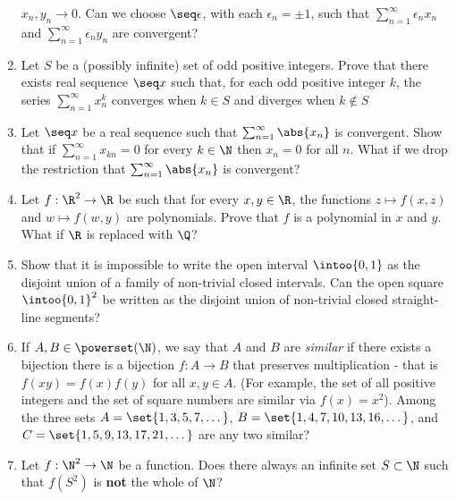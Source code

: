 \documentclass[12pt,a4paper]{article}
\begin{document}
\begin{enumerate}
       \(x_n, y_n \to 0\). Can we choose \(\seq \epsilon\), with each
       \(\epsilon_n = \pm 1\), such that
       \(\sum_{n = 1}^\infty \epsilon_n x_n\) and
       \(\sum_{n = 1}^\infty \epsilon_n y_n\) are convergent?
 \item Let \(S\) be a (possibly infinite) set of odd positive integers. Prove
       that there exists real sequence \(\seq x\) such that, for each odd
       positive integer \(k\), the series \(\sum_{n = 1}^\infty x_n^k\)
       converges when \(k \in S\) and diverges when \(k \notin S\)
 \item Let \(\seq x\) be a real sequence such that
       \(\sum_{n = 1}^\infty \abs{x_n}\) is convergent. Show that if
       \(\sum_{n = 1}^\infty x_{kn} = 0\) for every \(k \in \N\) then
       \(x_n = 0\) for all \(n\). What if we drop the restriction that
       \(\sum_{n = 1}^\infty \abs{x_n}\) is convergent?
 \item Let \(f: \R^2 \to \R\) be such that for every \(x, y \in \R\), the
       functions \(z \mapsto f(x, z)\) and \(w \mapsto f(w, y)\) are
       polynomials. Prove that \(f\) is a polynomial in \(x\) and \(y\). What if
       \(\R\) is replaced with \(\Q\)?
 \item Show that it is impossible to write the open interval
       \(\intoo{0, 1}\) as the
       disjoint union of a family of non-trivial closed intervals. Can the open
       square \(\intoo{0, 1}^2\) be written as the disjoint union of non-trivial
       closed straight-line segments?
 \item If \(A, B \in \powerset(\N)\), we say that \(A\) and \(B\) are
       \emph{similar} if there exists a bijection there is a bijection
       \(f: A \to B\) that preserves multiplication - that is
       \(f(xy) = f(x)f(y)\) for all \(x, y \in A\). (For example, the set of all
       positive integers and the set of square numbers are similar via
       \(f(x) = x^2\)). Among the three sets \(A = \set{1, 3, 5, 7, \dotsc}\),
       \(B = \set{1, 4, 7, 10, 13, 16, \dotsc}\),
       and \(C = \set{1, 5, 9, 13, 17, 21, \dotsc}\) are any two similar?
 \item Let \(f : \N^2 \to \N\) be a function. Does there always an infinite
       set \(S \subset \N\) such that \(f(S^2)\) is \textbf{not} the whole of
       \(\N\)?
\end{enumerate}
\end{document}
